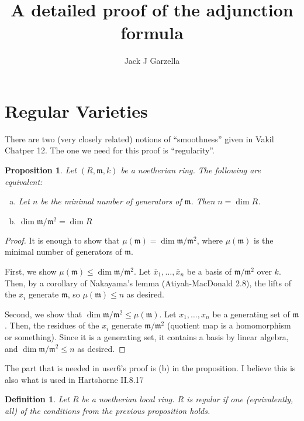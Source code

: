\documentclass[a4paper]{article}
\title{A detailed proof of the adjunction formula}
\author{Jack J Garzella}
\newtheorem{prop}[thm]{Proposition}
\newtheorem{defn}[thm]{Definition}
\begin{document}
\maketitle

\section{Regular Varieties}

There are two (very closely related)
notions of ``smoothness'' given in Vakil Chatper 12.
The one we need for this proof is ``regularity''.

\begin{prop}
	Let \((R,\mathfrak{m},k)\) be a noetherian ring. 
	The following are equivalent:
	\begin{enumerate}[(a)]
		\item Let \(n\) be the minimal number of generators of
			\(\mathfrak{m}\).
			Then \(n = \dim R\).
		\item \(\dim \mathfrak{m} / \mathfrak{m}^{2}  = \dim R\)
	\end{enumerate}
\end{prop}

\begin{proof}
	It is enough to show that 
	\(\mu(\mathfrak{m}) = \dim \mathfrak{m} / \mathfrak{m}^{2}\),
	where \(\mu(\mathfrak{m})\) is the minimal number of generators
	of \(\mathfrak{m}\).
	
	First, we show \(\mu(\mathfrak{m}) \leq \dim \mathfrak{m} / \mathfrak{m}^{2}\).
	Let \(\overline{x}_{1}, \ldots, \overline{x}_{n}\) 
	be a basis of \(\mathfrak{m} / \mathfrak{m}^{2}\) 
	over \(k\).
	Then, by a corollary of Nakayama's lemma (Atiyah-MacDonald 2.8),
	the lifts of the \(\overline{x}_{i}\) generate \(\mathfrak{m}\),
	so \(\mu(\mathfrak{m}) \leq n\) as desired.

	Second, we show that 
	\(\dim \mathfrak{m} / \mathfrak{m}^{2} \leq \mu(\mathfrak{m})\).
	Let \(x_{1}, \ldots, x_{n}\) be a generating set of 
	\(\mathfrak{m}\).
	Then, the residues of the \(x_{i}\) generate 
	\(\mathfrak{m} / \mathfrak{m}^{2}\) (quotient map is a 
	homomorphism or something).
	Since it is a generating set, it contains a basis by
	linear algebra, and
	\(\dim \mathfrak{m} / \mathfrak{m}^{2} \leq n\) as desired.
\end{proof}

The part that is needed in user6's proof is (b) in the proposition.
I believe this is also what is used in Hartshorne II.8.17

\begin{defn}
	Let \(R\) be a noetherian local ring.
	\(R\) is \textit{regular} if one (equivalently, all)
	of the conditions from the previous proposition holds.
\end{defn}
\end{document}
